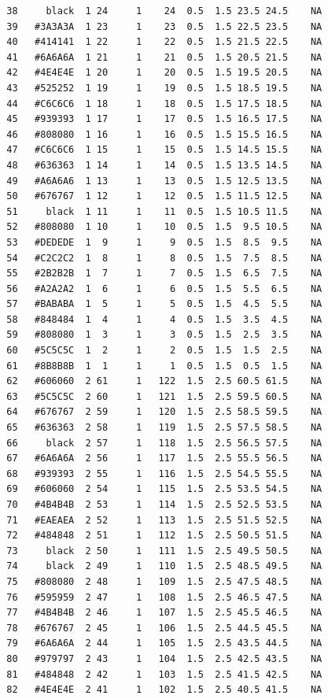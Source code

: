 \documentclass[12pt,twoside]{reedthesis}
\begin{document}
\begin{verbatim}
  38     black  1 24     1    24  0.5  1.5 23.5 24.5    NA
  39   #3A3A3A  1 23     1    23  0.5  1.5 22.5 23.5    NA
  40   #414141  1 22     1    22  0.5  1.5 21.5 22.5    NA
  41   #6A6A6A  1 21     1    21  0.5  1.5 20.5 21.5    NA
  42   #4E4E4E  1 20     1    20  0.5  1.5 19.5 20.5    NA
  43   #525252  1 19     1    19  0.5  1.5 18.5 19.5    NA
  44   #C6C6C6  1 18     1    18  0.5  1.5 17.5 18.5    NA
  45   #939393  1 17     1    17  0.5  1.5 16.5 17.5    NA
  46   #808080  1 16     1    16  0.5  1.5 15.5 16.5    NA
  47   #C6C6C6  1 15     1    15  0.5  1.5 14.5 15.5    NA
  48   #636363  1 14     1    14  0.5  1.5 13.5 14.5    NA
  49   #A6A6A6  1 13     1    13  0.5  1.5 12.5 13.5    NA
  50   #676767  1 12     1    12  0.5  1.5 11.5 12.5    NA
  51     black  1 11     1    11  0.5  1.5 10.5 11.5    NA
  52   #808080  1 10     1    10  0.5  1.5  9.5 10.5    NA
  53   #DEDEDE  1  9     1     9  0.5  1.5  8.5  9.5    NA
  54   #C2C2C2  1  8     1     8  0.5  1.5  7.5  8.5    NA
  55   #2B2B2B  1  7     1     7  0.5  1.5  6.5  7.5    NA
  56   #A2A2A2  1  6     1     6  0.5  1.5  5.5  6.5    NA
  57   #BABABA  1  5     1     5  0.5  1.5  4.5  5.5    NA
  58   #848484  1  4     1     4  0.5  1.5  3.5  4.5    NA
  59   #808080  1  3     1     3  0.5  1.5  2.5  3.5    NA
  60   #5C5C5C  1  2     1     2  0.5  1.5  1.5  2.5    NA
  61   #8B8B8B  1  1     1     1  0.5  1.5  0.5  1.5    NA
  62   #606060  2 61     1   122  1.5  2.5 60.5 61.5    NA
  63   #5C5C5C  2 60     1   121  1.5  2.5 59.5 60.5    NA
  64   #676767  2 59     1   120  1.5  2.5 58.5 59.5    NA
  65   #636363  2 58     1   119  1.5  2.5 57.5 58.5    NA
  66     black  2 57     1   118  1.5  2.5 56.5 57.5    NA
  67   #6A6A6A  2 56     1   117  1.5  2.5 55.5 56.5    NA
  68   #939393  2 55     1   116  1.5  2.5 54.5 55.5    NA
  69   #606060  2 54     1   115  1.5  2.5 53.5 54.5    NA
  70   #4B4B4B  2 53     1   114  1.5  2.5 52.5 53.5    NA
  71   #EAEAEA  2 52     1   113  1.5  2.5 51.5 52.5    NA
  72   #484848  2 51     1   112  1.5  2.5 50.5 51.5    NA
  73     black  2 50     1   111  1.5  2.5 49.5 50.5    NA
  74     black  2 49     1   110  1.5  2.5 48.5 49.5    NA
  75   #808080  2 48     1   109  1.5  2.5 47.5 48.5    NA
  76   #595959  2 47     1   108  1.5  2.5 46.5 47.5    NA
  77   #4B4B4B  2 46     1   107  1.5  2.5 45.5 46.5    NA
  78   #676767  2 45     1   106  1.5  2.5 44.5 45.5    NA
  79   #6A6A6A  2 44     1   105  1.5  2.5 43.5 44.5    NA
  80   #979797  2 43     1   104  1.5  2.5 42.5 43.5    NA
  81   #484848  2 42     1   103  1.5  2.5 41.5 42.5    NA
  82   #4E4E4E  2 41     1   102  1.5  2.5 40.5 41.5    NA

\end{verbatim}
\end{document}
